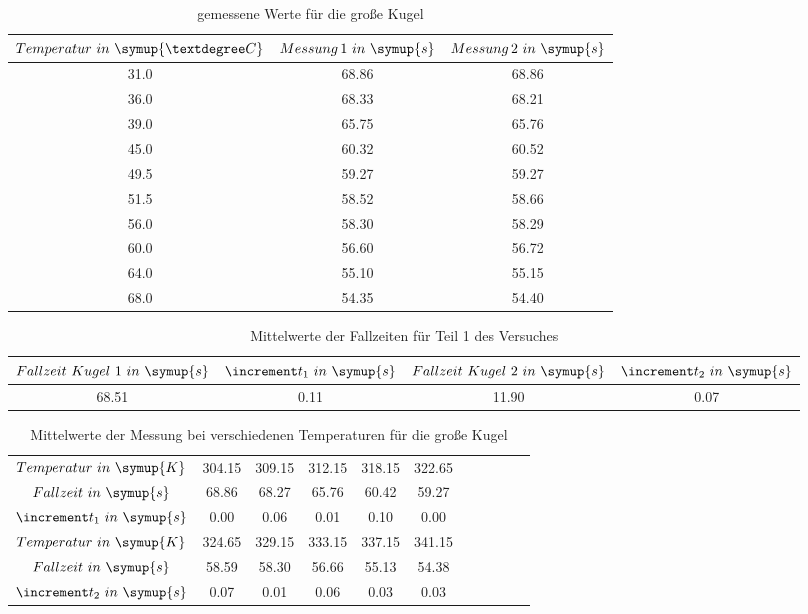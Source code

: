 \begin{table}
  \centering
  \caption{gemessene Werte für die große Kugel}
  \label{tab:Messdaten2}
  \begin{tabular}{c c c }
    \toprule  $Temperatur \,\, in \,\, \symup{°C}$ & $Messung \, 1 \,\, in \,\, \symup{s}$ &
              $Messung \, 2 \,\, in \,\, \symup{s}$ \\
    \midrule
    31.0 & 68.86 & 68.86 \\
    36.0 & 68.33 & 68.21 \\
    39.0 & 65.75 & 65.76 \\
    45.0 & 60.32 & 60.52 \\
    49.5 & 59.27 & 59.27 \\
    51.5 & 58.52 & 58.66 \\
    56.0 & 58.30 & 58.29 \\
    60.0 & 56.60 & 56.72 \\
    64.0 & 55.10 & 55.15 \\
    68.0 & 54.35 & 54.40 \\
    \bottomrule
  \end{tabular}
\end{table}

\begin{table}
  \centering
  \caption{Mittelwerte der Fallzeiten für Teil 1 des Versuches}
  \begin{tabular}{c c c c}
    \toprule $Fallzeit \,\, Kugel \,\, 1 \,\, in \,\, \symup{s}$ & $\increment t_1 \,\, in \,\, \symup{s}$ &
             $Fallzeit \,\, Kugel \,\, 2 \,\, in \,\, \symup{s}$ & $\increment t_2 \,\, in \,\, \symup{s}$ \\
    \midrule
    68.51 & 0.11 & 11.90 & 0.07 \\
    \bottomrule
  \end{tabular}
  \label{tab:FallzeitenGemittelt}
\end{table}

\begin{table}
  \centering
  \caption{Mittelwerte der Messung bei verschiedenen Temperaturen für die große Kugel}
  \label{tab:TemperaturGemittelt}
  \begin{tabular}{c | c c c c c c c c c c }
    \toprule
    $Temperatur \,\, in \,\,\symup{K}$          & 304.15 & 309.15 & 312.15 & 318.15 & 322.65 \\
    $Fallzeit \,\, in \,\,\symup{s}$            & 68.86 & 68.27 & 65.76 & 60.42 & 59.27 \\
    $\increment t_1 \,\, in \,\,\symup{s}$     & 0.00 & 0.06 & 0.01 & 0.10 & 0.00 \\
    \midrule
    $Temperatur \,\, in \,\, \symup{K}$          & 324.65 & 329.15 & 333.15 & 337.15 & 341.15 \\
    $Fallzeit \,\, in \,\, \symup{s}$           & 58.59 & 58.30 & 56.66 & 55.13 & 54.38 \\
    $\increment t_2 \,\, in \,\, \symup{s}$     & 0.07 & 0.01 & 0.06 & 0.03 & 0.03 \\
    \bottomrule
  \end{tabular}
\end{table}

